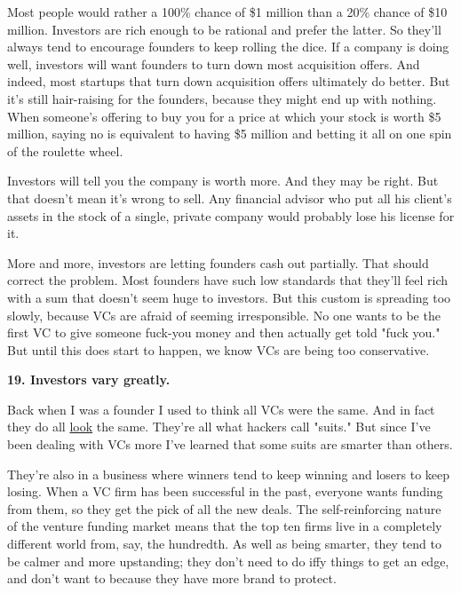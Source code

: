 Most people would rather a 100\% chance of \$1
                  million than a 20\% chance of \$10 million. Investors are rich
                  enough to be rational and prefer the latter. So they'll always
                  tend to encourage founders to keep rolling the dice. If a
                  company is doing well, investors will want founders to turn
                  down most acquisition offers. And indeed, most startups that
                  turn down acquisition offers ultimately do better. But it's
                  still hair-raising for the founders, because they might end up
                  with nothing. When someone's offering to buy you for a price
                  at which your stock is worth \$5 million, saying no is
                  equivalent to having \$5 million and betting it all on one spin
                  of the roulette wheel.

Investors will tell you the
                  company is worth more. And they may be right. But that doesn't
                  mean it's wrong to sell. Any financial advisor who put all his
                  client's assets in the stock of a single, private company
                  would probably lose his license for it.

More and
                  more, investors are letting founders cash out partially. That
                  should correct the problem. Most founders have such low
                  standards that they'll feel rich with a sum that doesn't seem
                  huge to investors. But this custom is spreading too slowly,
                  because VCs are afraid of seeming irresponsible. No one wants
                  to be the first VC to give someone fuck-you money and then
                  actually get told "fuck you." But until this does start to
                  happen, we know VCs are being too conservative.

\textbf{19. Investors vary greatly.}

Back when I was a founder I used to think all VCs
                  were the same. And in fact they do all
                  \href{http://www.redpoint.com/team/}{look} the same.
                  They're all what hackers call "suits." But since I've been
                  dealing with VCs more I've learned that some suits are smarter
                  than others.

They're also in a business where
                  winners tend to keep winning and losers to keep losing. When a
                  VC firm has been successful in the past, everyone wants
                  funding from them, so they get the pick of all the new deals.
                  The self-reinforcing nature of the venture funding market
                  means that the top ten firms live in a completely different
                  world from, say, the hundredth. As well as being smarter, they
                  tend to be calmer and more upstanding; they don't need to do
                  iffy things to get an edge, and don't want to because they
                  have more brand to protect.

